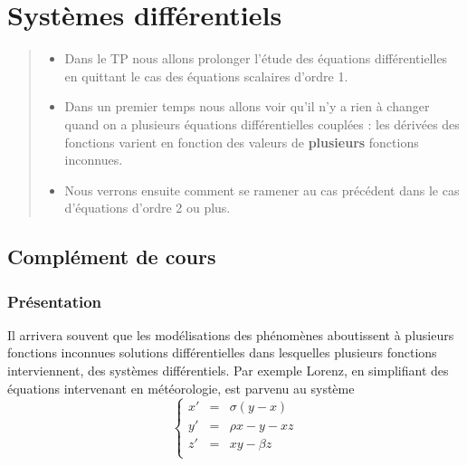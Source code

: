 \chapter{Systèmes différentiels}
\thispagestyle{empty}
\begin{abstract}
\begin{itemize}
    \item Dans le TP nous allons prolonger l'étude des équations différentielles en quittant le cas des équations scalaires d'ordre 1.
    \item Dans un premier temps nous allons voir qu'il n'y a rien à changer quand on a plusieurs équations différentielles couplées : les dérivées des fonctions varient en fonction des valeurs de {\bf plusieurs} fonctions inconnues.
    \item Nous verrons ensuite comment se ramener au cas précédent dans le cas d'équations d'ordre 2 ou plus.
\end{itemize}
\end{abstract}
\section{Complément de cours}
\subsection{Présentation}
Il arrivera souvent que les modélisations des phénomènes aboutissent à plusieurs fonctions inconnues solutions différentielles dans lesquelles plusieurs fonctions interviennent, des systèmes différentiels. Par exemple Lorenz, en simplifiant des équations intervenant en météorologie, est parvenu au système 
\[\left\{\begin{matrix}x'&=&\sigma(y-x)\\ y' &=& \rho x - y - xz\\
z'&=& xy - \beta z\\
\end{matrix}\right.\]

